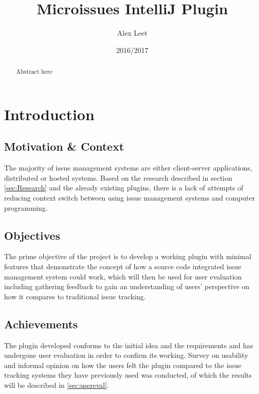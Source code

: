 \documentclass{4thYearProject}
\begin{document}
\title{Microissues IntelliJ Plugin}
\author{Alex Leet}
\date{2016/2017}
\maketitle

\begin{abstract}
Abstract here
\end{abstract}

\educationalconsent

\tableofcontents

\chapter{Introduction}

\section{Motivation \& Context}

The majority of issue management systems are either client-server applications, distributed or hosted systems. Based on the research described in section \ref{sec:Research} and the already existing plugins, there is a lack of attempts of reducing context switch between using issue management systems and computer programming. 

\section{Objectives}

The prime objective of the project is to develop a working plugin with minimal features that demonstrate the concept of how a source code integrated issue management system could work, which will then be used for user evaluation including gathering feedback to gain an understanding of users' perspective on how it compares to traditional issue tracking.

\section{Achievements}

The plugin developed conforms to the initial idea and the requirements and has undergone user evaluation in order to confirm its working. Survey on usability and informal opinion on how the users felt the plugin compared to the issue tracking systems they have previously used was conducted, of which the results will be described in \ref{sec:usereval}.
\end{document}
